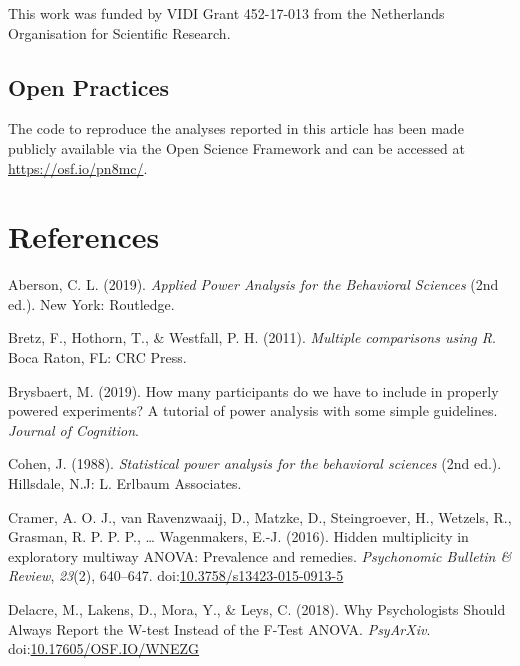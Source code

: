 \documentclass[,jou,floatsintext]{apa6}
\begin{document}
This work was funded by VIDI Grant 452-17-013 from the Netherlands Organisation for Scientific Research.

\hypertarget{open-practices}{%
\subsection{Open Practices}\label{open-practices}}

The code to reproduce the analyses reported in this article has been made publicly available via the Open Science Framework and can be accessed at \url{https://osf.io/pn8mc/}.

\hypertarget{references}{%
\section{References}\label{references}}

\setlength{\parindent}{-0.5in}
\setlength{\leftskip}{0.5in}

\hypertarget{refs}{}
\leavevmode\hypertarget{ref-aberson_applied_2019}{}%
Aberson, C. L. (2019). \emph{Applied Power Analysis for the Behavioral Sciences} (2nd ed.). New York: Routledge.

\leavevmode\hypertarget{ref-bretz_multiple_2011}{}%
Bretz, F., Hothorn, T., \& Westfall, P. H. (2011). \emph{Multiple comparisons using R}. Boca Raton, FL: CRC Press.

\leavevmode\hypertarget{ref-brysbaert_how_2019}{}%
Brysbaert, M. (2019). How many participants do we have to include in properly powered experiments? A tutorial of power analysis with some simple guidelines. \emph{Journal of Cognition}.

\leavevmode\hypertarget{ref-cohen_statistical_1988}{}%
Cohen, J. (1988). \emph{Statistical power analysis for the behavioral sciences} (2nd ed.). Hillsdale, N.J: L. Erlbaum Associates.

\leavevmode\hypertarget{ref-cramer_hidden_2016}{}%
Cramer, A. O. J., van Ravenzwaaij, D., Matzke, D., Steingroever, H., Wetzels, R., Grasman, R. P. P. P., \ldots{} Wagenmakers, E.-J. (2016). Hidden multiplicity in exploratory multiway ANOVA: Prevalence and remedies. \emph{Psychonomic Bulletin \& Review}, \emph{23}(2), 640--647. doi:\href{https://doi.org/10.3758/s13423-015-0913-5}{10.3758/s13423-015-0913-5}

\leavevmode\hypertarget{ref-delacre_why_2018}{}%
Delacre, M., Lakens, D., Mora, Y., \& Leys, C. (2018). Why Psychologists Should Always Report the W-test Instead of the F-Test ANOVA. \emph{PsyArXiv}. doi:\href{https://doi.org/10.17605/OSF.IO/WNEZG}{10.17605/OSF.IO/WNEZG}
\end{document}
